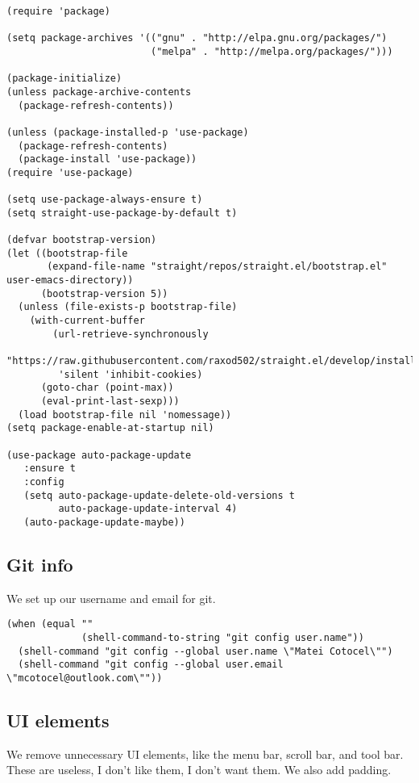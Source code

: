 \documentclass[11pt]{article}
\begin{document}
\begin{verbatim}
(require 'package)

(setq package-archives '(("gnu" . "http://elpa.gnu.org/packages/")
                         ("melpa" . "http://melpa.org/packages/")))

(package-initialize)
(unless package-archive-contents
  (package-refresh-contents))

(unless (package-installed-p 'use-package)
  (package-refresh-contents)
  (package-install 'use-package))
(require 'use-package)

(setq use-package-always-ensure t)
(setq straight-use-package-by-default t)

(defvar bootstrap-version)
(let ((bootstrap-file
       (expand-file-name "straight/repos/straight.el/bootstrap.el" user-emacs-directory))
      (bootstrap-version 5))
  (unless (file-exists-p bootstrap-file)
    (with-current-buffer
        (url-retrieve-synchronously
         "https://raw.githubusercontent.com/raxod502/straight.el/develop/install.el"
         'silent 'inhibit-cookies)
      (goto-char (point-max))
      (eval-print-last-sexp)))
  (load bootstrap-file nil 'nomessage))
(setq package-enable-at-startup nil)

(use-package auto-package-update
   :ensure t
   :config
   (setq auto-package-update-delete-old-versions t
         auto-package-update-interval 4)
   (auto-package-update-maybe))
\end{verbatim}

\subsection*{Git info}
\label{sec:orgfd18f1e}

We set up our username and email for git.

\begin{verbatim}
(when (equal ""
             (shell-command-to-string "git config user.name"))
  (shell-command "git config --global user.name \"Matei Cotocel\"")
  (shell-command "git config --global user.email \"mcotocel@outlook.com\""))
\end{verbatim}

\subsection*{UI elements}
\label{sec:orgee60115}

We remove unnecessary UI elements, like the menu bar, scroll bar, and tool bar. These are useless, I don't like them, I don't want them. We also add padding.
\end{document}
